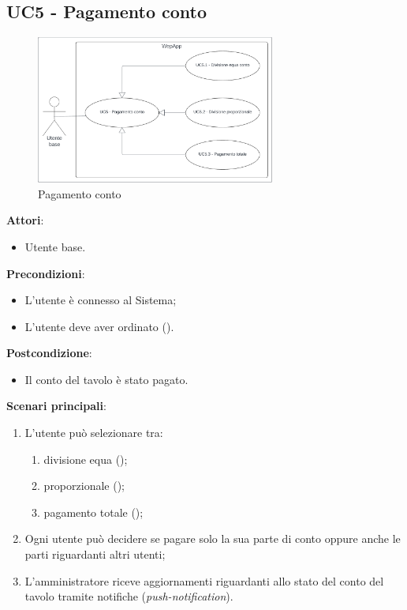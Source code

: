 \subsection{UC5 - Pagamento conto}\label{usecase:5}
\begin{figure}[H]
    \centering
    \includegraphics[width=0.7\textwidth]{ucd/UCD5.png}
\caption{Pagamento conto}
\end{figure}
\textbf{Attori}:
\begin{itemize}
    \item Utente base.
\end{itemize}
\textbf{Precondizioni}:
\begin{itemize}
    \item L'utente è connesso al Sistema;
    \item L'utente deve aver ordinato ().
\end{itemize}
\textbf{Postcondizione}:
\begin{itemize}
    \item Il conto del tavolo è stato pagato.
\end{itemize}
\textbf{Scenari principali}:
\begin{enumerate}
    \item L'utente può selezionare tra:
    \begin{enumerate}
        \item divisione equa ();
        \item proporzionale ();
        \item pagamento totale ();
    \end{enumerate}
    \item Ogni utente può decidere se pagare solo la sua parte di conto oppure anche le parti riguardanti altri utenti;
    \item L'amministratore riceve aggiornamenti riguardanti allo stato del conto del tavolo tramite notifiche (\emph{push-notification}).
\end{enumerate}



\newpage